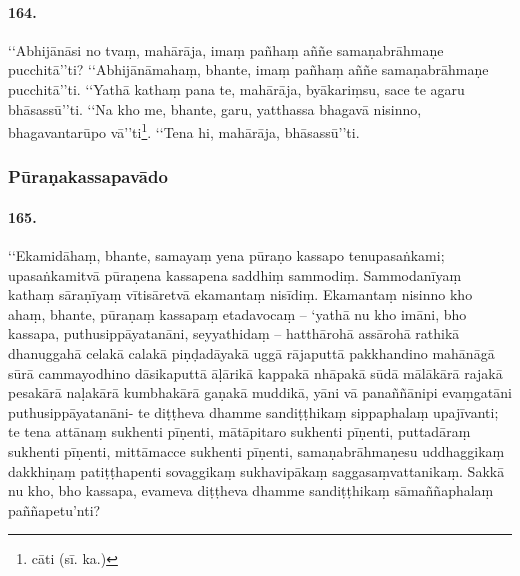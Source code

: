 \paragraph{164.} ‘‘Abhijānāsi no tvaṃ, mahārāja, imaṃ pañhaṃ aññe samaṇabrāhmaṇe pucchitā’’ti? ‘‘Abhijānāmahaṃ, bhante, imaṃ pañhaṃ aññe samaṇabrāhmaṇe pucchitā’’ti. ‘‘Yathā kathaṃ pana te, mahārāja, byākariṃsu, sace te agaru bhāsassū’’ti. ‘‘Na kho me, bhante, garu, yatthassa bhagavā nisinno, bhagavantarūpo vā’’ti\footnote{cāti (sī. ka.)}. ‘‘Tena hi, mahārāja, bhāsassū’’ti.

\subsubsection{Pūraṇakassapavādo}

\paragraph{165.} ‘‘Ekamidāhaṃ, bhante, samayaṃ yena pūraṇo kassapo tenupasaṅkami; upasaṅkamitvā pūraṇena kassapena saddhiṃ sammodiṃ. Sammodanīyaṃ kathaṃ sāraṇīyaṃ vītisāretvā ekamantaṃ nisīdiṃ. Ekamantaṃ nisinno kho ahaṃ, bhante, pūraṇaṃ kassapaṃ etadavocaṃ – ‘yathā nu kho imāni, bho kassapa, puthusippāyatanāni, seyyathidaṃ – hatthārohā assārohā rathikā dhanuggahā celakā calakā piṇḍadāyakā uggā rājaputtā pakkhandino mahānāgā sūrā cammayodhino dāsikaputtā āḷārikā kappakā nhāpakā sūdā mālākārā rajakā pesakārā naḷakārā kumbhakārā gaṇakā muddikā, yāni vā panaññānipi evaṃgatāni puthusippāyatanāni- te diṭṭheva dhamme sandiṭṭhikaṃ sippaphalaṃ upajīvanti; te tena attānaṃ sukhenti pīṇenti, mātāpitaro sukhenti pīṇenti, puttadāraṃ sukhenti pīṇenti, mittāmacce sukhenti pīṇenti, samaṇabrāhmaṇesu uddhaggikaṃ dakkhiṇaṃ patiṭṭhapenti sovaggikaṃ sukhavipākaṃ saggasaṃvattanikaṃ. Sakkā nu kho, bho kassapa, evameva diṭṭheva dhamme sandiṭṭhikaṃ sāmaññaphalaṃ paññapetu’nti?

